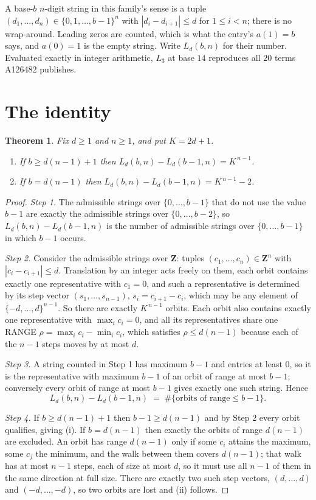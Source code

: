 \documentclass[11pt,a4paper]{article}
\theoremstyle{plain}
\newtheorem{theorem}{Theorem}
\theoremstyle{definition}
\begin{document}
A base-$b$ $n$-digit string in this family's sense is a tuple
$(d_1,\dots,d_n)\in\{0,1,\dots,b-1\}^{n}$ with $|d_i-d_{i+1}|\le d$ for $1\le i<n$; there
is no wrap-around. Leading zeros are counted, which is what the entry's $a(1)=b$ says, and
$a(0)=1$ is the empty string. Write $L_d(b,n)$ for their number. Evaluated exactly in integer
arithmetic, $L_{3}$ at base $14$ reproduces all $20$ terms A126482 publishes.

\section{The identity}

\begin{theorem}
Fix $d\ge1$ and $n\ge1$, and put $K=2d+1$.
\begin{enumerate}
\item[(i)] If $b\ge d(n-1)+1$ then $L_d(b,n)-L_d(b-1,n)=K^{\,n-1}$.
\item[(ii)] If $b=d(n-1)$ then $L_d(b,n)-L_d(b-1,n)=K^{\,n-1}-2$.
\end{enumerate}
\end{theorem}

\begin{proof}
\emph{Step 1.} The admissible strings over $\{0,\dots,b-1\}$ that do not use the value $b-1$
are exactly the admissible strings over $\{0,\dots,b-2\}$, so $L_d(b,n)-L_d(b-1,n)$ is the
number of admissible strings over $\{0,\dots,b-1\}$ in which $b-1$ occurs.

\emph{Step 2.} Consider the admissible strings over $\mathbf{Z}$: tuples
$(c_1,\dots,c_n)\in\mathbf{Z}^{n}$ with $|c_i-c_{i+1}|\le d$. Translation by an integer acts
freely on them, each orbit contains exactly one representative with $c_1=0$, and such a
representative is determined by its step vector $(s_1,\dots,s_{n-1})$, $s_i=c_{i+1}-c_i$,
which may be any element of $\{-d,\dots,d\}^{n-1}$. So there are exactly $K^{\,n-1}$ orbits.
Each orbit also contains exactly one representative with $\max_i c_i=0$, and all its
representatives share one RANGE $\rho=\max_ic_i-\min_ic_i$, which satisfies
$\rho\le d(n-1)$ because each of the $n-1$ steps moves by at most $d$.

\emph{Step 3.} A string counted in Step 1 has maximum $b-1$ and entries at least $0$, so it is
the representative with maximum $b-1$ of an orbit of range at most $b-1$; conversely every orbit
of range at most $b-1$ gives exactly one such string. Hence
\[
L_d(b,n)-L_d(b-1,n)\;=\;\#\{\text{orbits of range}\le b-1\} .
\]

\emph{Step 4.} If $b\ge d(n-1)+1$ then $b-1\ge d(n-1)$ and by Step 2 every orbit qualifies,
giving (i). If $b=d(n-1)$ then exactly the orbits of range $d(n-1)$ are excluded. An orbit has
range $d(n-1)$ only if some $c_i$ attains the maximum, some $c_j$ the minimum, and the walk
between them covers $d(n-1)$; that walk has at most $n-1$ steps, each of size at most $d$, so it
must use all $n-1$ of them in the same direction at full size. There are exactly two such step
vectors, $(d,\dots,d)$ and $(-d,\dots,-d)$, so two orbits are lost and (ii) follows.
\end{proof}
\end{document}
